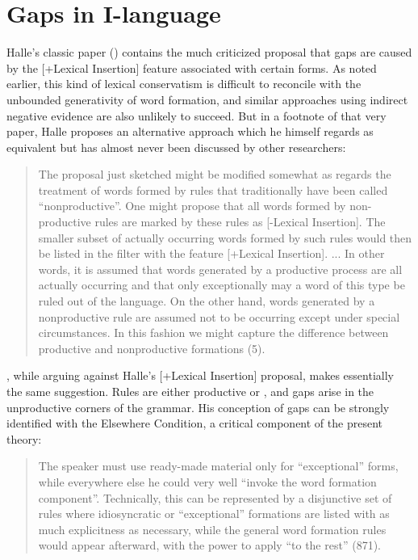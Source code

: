 \documentclass[output=paper,
modfonts
]{LSP/langsci}
\begin{document}
\section{Gaps in  I-language}
Halle's classic paper (\citeyear{Halle1973a}) contains the much
criticized proposal that gaps are caused by the [+Lexical Insertion]
feature associated with certain forms. As noted earlier, this kind of
lexical conservatism is difficult to reconcile with the unbounded
generativity of word formation, and similar approaches using indirect
negative evidence are also unlikely to succeed. But in a footnote
of that very paper, Halle proposes an alternative approach which he
himself regards as equivalent but has almost never been discussed by other
researchers:

\begin{quote}
The proposal just sketched might be modified somewhat as regards the
treatment of words formed by rules that traditionally have been called
``nonproductive''. One might propose that all words formed by
non-productive rules are marked by these rules as [-Lexical
Insertion]. The smaller subset of actually occurring words formed by 
such rules would then be listed in the filter with the feature
[+Lexical Insertion].  ... In other words, it is assumed that words
generated by a productive process are all actually occurring and that
only exceptionally may a word of this type be ruled out of the
language. On the other hand, words generated by a nonproductive rule
are assumed not to be occurring except under special circumstances. In
this fashion we might capture the difference between productive and
nonproductive formations (5). 
\end{quote}

\citet{Hetzron1975}, while arguing against Halle's [+Lexical
Insertion] proposal,  makes essentially the same suggestion. Rules
are either productive or , and gaps arise in the
unproductive corners of the grammar. His conception of gaps can be
strongly identified with the Elsewhere Condition, a critical component
of the present theory:  
\begin{quote}
The speaker must use ready-made material only for ``exceptional'' forms,
while everywhere else he could very well ``invoke the word formation
component''. Technically, this can be represented by a disjunctive 
set of rules where idiosyncratic or ``exceptional'' formations are
listed with as much explicitness as necessary, while the general word
formation rules would appear afterward, with the power to apply 
``to the rest'' (871). 
\end{quote}
\end{document}
